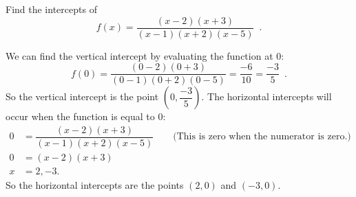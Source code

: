 \begin{example}
Find the intercepts of
$$f(x)=\dfrac{(x-2)(x+3)}{(x-1)(x+2)(x-5)} \enspace .$$
\begin{solution} We can find the vertical intercept by evaluating the function at 0:
$$f(0)=\dfrac{(0-2)(0+3)}{(0-1)(0+2)(0-5)}=\dfrac{-6}{10}=\dfrac{-3}{5} \enspace .$$
So the vertical intercept is the point $\left(0, \dfrac{-3}{5}\right)$.
The horizontal intercepts will occur when the function is equal to 0:
\begin{align*}
		0 &= \dfrac{(x-2)(x+3)}{(x-1)(x+2)(x-5)} \qquad \text{(This is zero when the numerator is zero.)}\\
		0 &= (x-2)(x+3)\\
		x &= 2, -3.
\end{align*}
So the horizontal intercepts are the points $(2, 0)$ and $(-3, 0)$.
\end{solution}\end{example}
